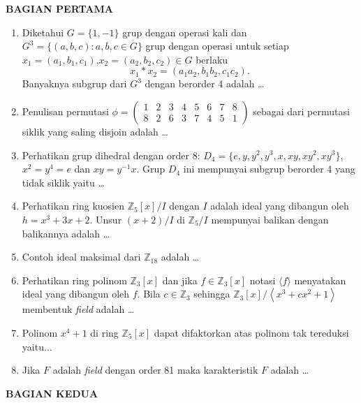 \documentclass[12pt,twoside]{article}
\begin{document}
\textbf{BAGIAN PERTAMA}
\begin{enumerate}
	\item Diketahui $G=\{1,-1\}$ grup dengan operasi kali dan $G^3=\{(a,b,c):a,b,c\in G\}$ grup dengan operasi untuk setiap $x_1=(a_1,b_1,c_1)$,$x_2=(a_2,b_2,c_2)\in G$ berlaku $$x_1*x_2=(a_1a_2,b_1b_2,c_1c_2).$$
	      Banyaknya subgrup dari $G^3$ dengan berorder 4 adalah \dots
	\item Penulisan permutasi $\phi=\left(\begin{array}{cccccccc}
			      1 & 2 & 3 & 4 & 5 & 6 & 7 & 8 \\8&2&6&3&7&4&5&1
		      \end{array}\right)$ sebagai dari permutasi siklik yang saling disjoin adalah \dots
	\item Perhatikan grup dihedral dengan order 8: $D_4=\{e,y,y^2,y^3,x,xy,xy^2,xy^3 \}$, $x^2=y^4=e$ dan $xy=y^{-1}x$. Grup $D_4$ ini mempunyai subgrup berorder 4 yang tidak siklik yaitu \dots
	\item Perhatikan ring kuosien $\mathbb{Z}_5[x]/I$ dengan $I$ adalah ideal yang dibangun oleh $h=x^3+3x+2$. Unsur $(x+2)/I$ di $\mathbb{Z}_5/I$ mempunyai balikan dengan balikannya adalah \dots
	\item Contoh ideal maksimal dari $\mathbb{Z}_{18}$ adalah \dots
	\item Perhatikan ring polinom $\mathbb{Z}_3[x]$ dan jika $f\in \mathbb{Z}_3[x]$ notasi $\langle f\rangle$ menyatakan ideal yang dibangun oleh $f$. Bila $c\in \mathbb{Z}_3$ sehingga $\mathbb{Z}_3[x]/\left\langle x^3+cx^2+1 \right\rangle $ membentuk \textit{field} adalah \dots
	\item Polinom $x^4+1$ di ring $\mathbb{Z}_5[x]$ dapat difaktorkan atas polinom tak tereduksi yaitu$\dots $
	\item Jika $F$ adalah \textit{field} dengan order 81 maka karakteristik $F$ adalah \dots

\end{enumerate}
\newpage
\newpage \textbf{BAGIAN KEDUA}
\end{document}
